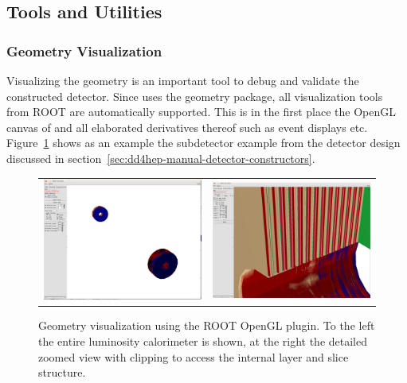 \documentclass[10pt,a4paper]{article}
\begin{document}
\newpage
\subsection{Tools and Utilities}

\subsubsection{Geometry Visualization}
\label{sec:dd4hep-manual-geometry-visualization}
\noindent
Visualizing the geometry is an important tool to debug and validate
the constructed detector.
Since \DDhep uses the  geometry package, all visualization tools
from ROOT are automatically supported. This is in the first place the 
OpenGL canvas of  and all elaborated derivatives thereof such as 
event displays etc. Figure~\ref{fig:dd4hep-user-manual-visualization-subdetector}
shows as an example the subdetector example from the  detector design
discussed in section~\ref{sec:dd4hep-manual-detector-constructors}.
\begin{figure}[h]
  \begin{center}
    \begin{tabular}{l r}
      \includegraphics[width=80mm] {DD4hep-Lumical} &
      \includegraphics[width=80mm] {DD4hep-Lumical-detailed} \\
    \end{tabular}
    \caption{Geometry visualization using the ROOT OpenGL plugin.
        To the left the entire luminosity calorimeter is shown,
        at the right the detailed zoomed view with clipping to 
        access the internal layer and slice structure.}
    \label{fig:dd4hep-user-manual-visualization-subdetector}
  \end{center}
\end{figure}
\end{document}
